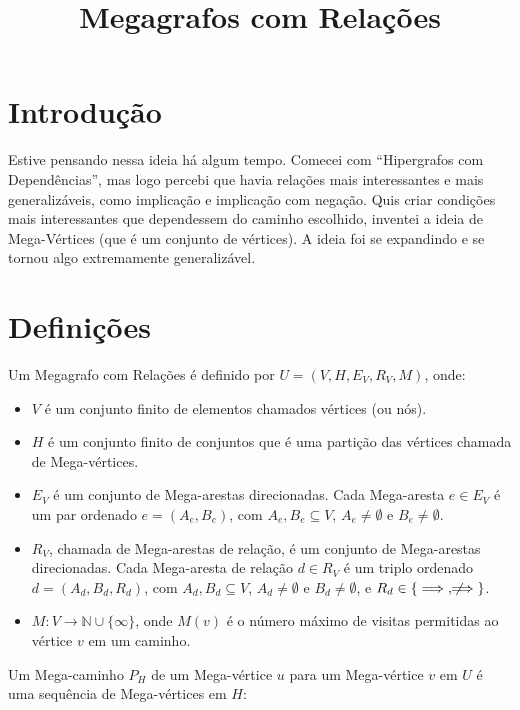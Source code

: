 \documentclass{article}
\title{Megagrafos com Relações}
\author{}
\begin{document}
\maketitle

\section{Introdução}

Estive pensando nessa ideia há algum tempo. Comecei com ``Hipergrafos com Dependências'', mas logo percebi que havia relações mais interessantes e mais generalizáveis, como implicação e implicação com negação. Quis criar condições mais interessantes que dependessem do caminho escolhido, inventei a ideia de Mega-Vértices (que é um conjunto de vértices). A ideia foi se expandindo e se tornou algo extremamente generalizável.

\section{Definições}

Um Megagrafo com Relações é definido por \( U = (V, H, E_V, R_V, M) \), onde:

\begin{itemize}
    \item \( V \) é um conjunto finito de elementos chamados vértices (ou nós).
    \item \( H \) é um conjunto finito de conjuntos que é uma partição das vértices chamada de Mega-vértices.
    \item \( E_V \) é um conjunto de Mega-arestas direcionadas. Cada Mega-aresta \( e \in E_V \) é um par ordenado \( e = (A_e, B_e) \), com \( A_e, B_e \subseteq V \), \( A_e \neq \emptyset \) e \( B_e \neq \emptyset \).
    \item \( R_V \), chamada de Mega-arestas de relação, é um conjunto de Mega-arestas direcionadas. Cada Mega-aresta de relação \( d \in R_V \) é um triplo ordenado \( d = (A_d, B_d, R_d) \), com \( A_d, B_d \subseteq V \), \( A_d \neq \emptyset \) e \( B_d \neq \emptyset \), e \( R_d \in \{\implies, \not\!\!\!\implies\} \).
    \item \( M: V \to \mathbb{N} \cup \{\infty\} \), onde \( M(v) \) é o número máximo de visitas permitidas ao vértice \( v \) em um caminho.
\end{itemize}

Um Mega-caminho \( P_H \) de um Mega-vértice \( u \) para um Mega-vértice \( v \) em \( U \) é uma sequência de Mega-vértices em \( H \):
\end{document}
